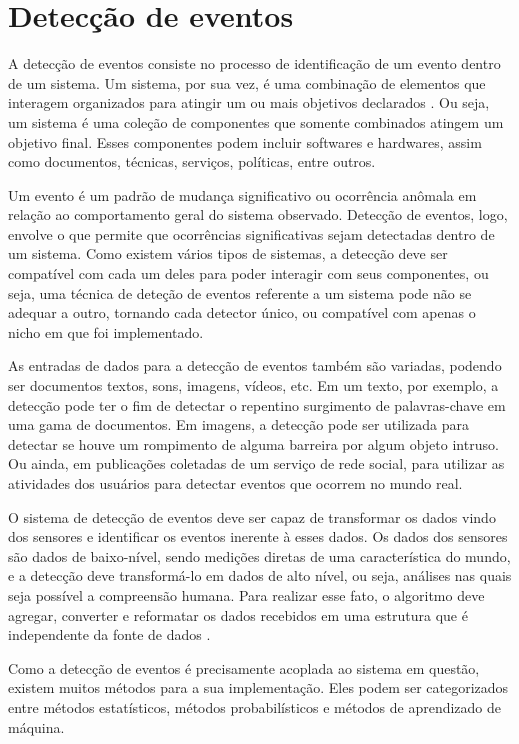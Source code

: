 \chapter{Detecção de eventos}

A detecção de eventos consiste no processo de identificação de um evento dentro de um sistema. Um sistema, por sua vez, é uma combinação de elementos que interagem organizados para atingir um ou mais objetivos declarados \cite{ISOIEC24765}. Ou seja, um sistema é uma coleção de componentes que somente combinados atingem um objetivo final. Esses componentes podem incluir softwares e hardwares, assim como documentos, técnicas, serviços, políticas, entre outros.

Um evento é um padrão de mudança significativo ou ocorrência anômala em relação ao comportamento geral do sistema observado. Detecção de eventos, logo, envolve o que permite que ocorrências significativas sejam detectadas dentro de um sistema. Como existem vários tipos de sistemas, a detecção deve ser compatível com cada um deles para poder interagir com seus componentes, ou seja, uma técnica de deteção de eventos referente a um sistema pode não se adequar a outro, tornando cada detector único, ou compatível com apenas o nicho em que foi implementado.

As entradas de dados para a detecção de eventos também são variadas, podendo ser documentos textos, sons, imagens, vídeos, etc. Em um texto, por exemplo, a detecção pode ter o fim de detectar o repentino surgimento de palavras-chave em uma gama de documentos. Em imagens, a detecção pode ser utilizada para detectar se houve um rompimento de alguma barreira por algum objeto intruso. Ou ainda, em publicações coletadas de um serviço de rede social, para utilizar as atividades dos usuários para detectar eventos que ocorrem no mundo real.

O sistema de detecção de eventos deve ser capaz de transformar os dados vindo dos sensores e identificar os eventos inerente à esses dados. Os dados dos sensores são dados de baixo-nível, sendo medições diretas de uma característica do mundo, e a detecção deve transformá-lo em dados de alto nível, ou seja, análises nas quais seja possível a compreensão humana. Para realizar esse fato, o algoritmo deve agregar, converter e reformatar os dados recebidos em uma estrutura que é independente da fonte de dados \cite{Fienberg2005}.

Como a detecção de eventos é precisamente acoplada ao sistema em questão, existem muitos métodos para a sua implementação. Eles podem ser categorizados entre métodos estatísticos, métodos probabilísticos e métodos de aprendizado de máquina. 

